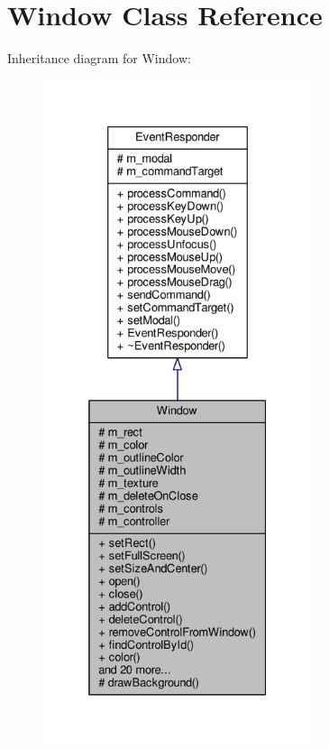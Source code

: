 \hypertarget{classWindow}{}\section{Window Class Reference}
\label{classWindow}


Inheritance diagram for Window\+:
\nopagebreak
\begin{figure}[H]
\begin{center}
\leavevmode
\includegraphics[height=550pt]{d5/d7b/classWindow__inherit__graph}
\end{center}
\end{figure}



